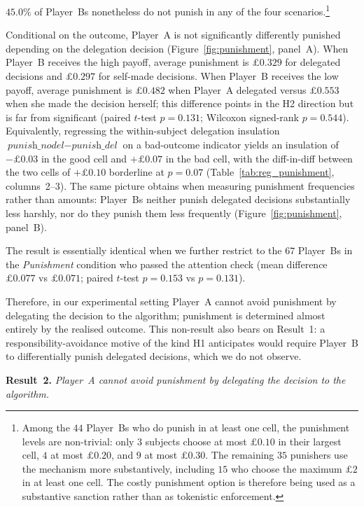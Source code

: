 $45.0\%$ of Player~Bs nonetheless do not punish in any of the four scenarios.\footnote{Among the $44$ Player~Bs who do punish in at least one cell, the punishment levels are non-trivial: only $3$ subjects choose at most $\pounds 0.10$ in their largest cell, $4$ at most $\pounds 0.20$, and $9$ at most $\pounds 0.30$. The remaining $35$ punishers use the mechanism more substantively, including $15$ who choose the maximum $\pounds 2$ in at least one cell. The costly punishment option is therefore being used as a substantive sanction rather than as tokenistic enforcement.}

Conditional on the outcome, Player~A is not significantly differently punished depending on the delegation decision (Figure~\ref{fig:punishment}, panel~A). When Player~B receives the high payoff, average punishment is $\pounds 0.329$ for delegated decisions and $\pounds 0.297$ for self-made decisions. When Player~B receives the low payoff, average punishment is $\pounds 0.482$ when Player~A delegated versus $\pounds 0.553$ when she made the decision herself; this difference points in the H2 direction but is far from significant (paired $t$-test $p=0.131$; Wilcoxon signed-rank $p=0.544$). Equivalently, regressing the within-subject delegation insulation $\textit{punish\_nodel}-\textit{punish\_del}$ on a bad-outcome indicator yields an insulation of $-\pounds 0.03$ in the good cell and $+\pounds 0.07$ in the bad cell, with the diff-in-diff between the two cells of $+\pounds 0.10$ borderline at $p=0.07$ (Table~\ref{tab:reg_punishment}, columns~2--3). The same picture obtains when measuring punishment frequencies rather than amounts: Player~Bs neither punish delegated decisions substantially less harshly, nor do they punish them less frequently (Figure~\ref{fig:punishment}, panel~B).

The result is essentially identical when we further restrict to the $67$ Player~Bs in the \textit{Punishment} condition who passed the attention check (mean difference $\pounds 0.077$ vs $\pounds 0.071$; paired $t$-test $p=0.153$ vs $p=0.131$).

Therefore, in our experimental setting Player~A cannot avoid punishment by delegating the decision to the algorithm; punishment is determined almost entirely by the realised outcome. This non-result also bears on Result~1: a responsibility-avoidance motive of the kind H1 anticipates would require Player~B to differentially punish delegated decisions, which we do not observe.

\medskip
\noindent\textbf{Result~2.} \textit{Player~A cannot avoid punishment by delegating the decision to the algorithm.}
\medskip

